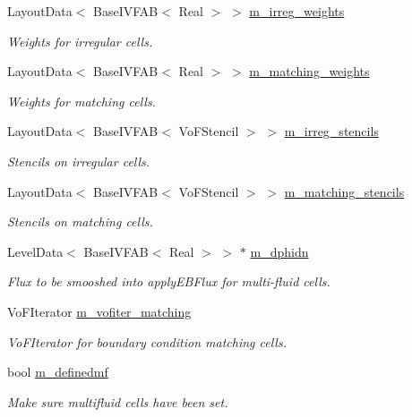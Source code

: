 \begin{DoxyCompactItemize}
Layout\+Data$<$ Base\+I\+V\+F\+AB$<$ Real $>$ $>$ \hyperlink{classmfdirichletconductivityebbc_a2c847b85472e27bf802b40186843e402}{m\+\_\+irreg\+\_\+weights}
\begin{DoxyCompactList}\small\item\em Weights for irregular cells. \end{DoxyCompactList}\item 
Layout\+Data$<$ Base\+I\+V\+F\+AB$<$ Real $>$ $>$ \hyperlink{classmfdirichletconductivityebbc_a31b059192cb6488ccd680b7660003623}{m\+\_\+matching\+\_\+weights}
\begin{DoxyCompactList}\small\item\em Weights for matching cells. \end{DoxyCompactList}\item 
Layout\+Data$<$ Base\+I\+V\+F\+AB$<$ Vo\+F\+Stencil $>$ $>$ \hyperlink{classmfdirichletconductivityebbc_ae3cafa8c8269a7668956b4507613dc4f}{m\+\_\+irreg\+\_\+stencils}
\begin{DoxyCompactList}\small\item\em Stencils on irregular cells. \end{DoxyCompactList}\item 
Layout\+Data$<$ Base\+I\+V\+F\+AB$<$ Vo\+F\+Stencil $>$ $>$ \hyperlink{classmfdirichletconductivityebbc_af828523744be351bc8c65e52fd8515d3}{m\+\_\+matching\+\_\+stencils}
\begin{DoxyCompactList}\small\item\em Stencils on matching cells. \end{DoxyCompactList}\item 
Level\+Data$<$ Base\+I\+V\+F\+AB$<$ Real $>$ $>$ $\ast$ \hyperlink{classmfdirichletconductivityebbc_acefc13fd067aa302b9b8f5a08bd91b1a}{m\+\_\+dphidn}
\begin{DoxyCompactList}\small\item\em Flux to be smooshed into apply\+E\+B\+Flux for multi-\/fluid cells. \end{DoxyCompactList}\item 
Vo\+F\+Iterator \hyperlink{classmfdirichletconductivityebbc_a220d4443c492a83456af24aa34a2457c}{m\+\_\+vofiter\+\_\+matching}
\begin{DoxyCompactList}\small\item\em Vo\+F\+Iterator for boundary condition matching cells. \end{DoxyCompactList}\item 
bool \hyperlink{classmfdirichletconductivityebbc_aef00c3a42ff0718780f0c6e97ab4906e}{m\+\_\+definedmf}
\begin{DoxyCompactList}\small\item\em Make sure multifluid cells have been set. \end{DoxyCompactList}\end{DoxyCompactItemize}


